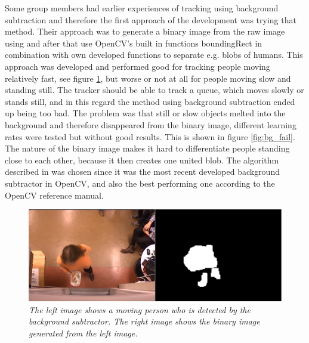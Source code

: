 
Some group members had earlier experiences of tracking using background subtraction and therefore the first approach of the development was trying that method. Their approach was to generate a binary image from the raw image using \cite{Gardel} and after that use OpenCV’s built in functions boundingRect in combination with own developed functions to separate e.g. blobs of humans. This approach was developed and performed good for tracking people moving relatively fast, see figure \ref{fig:bg_success}, but worse or not at all for people moving slow and standing still. The tracker should be able to track a queue, which moves slowly or stands still, and in this regard the method using background subtraction ended up being too bad. The problem was that still or slow objects melted into the background and therefore disappeared from the binary image, different learning rates were tested but without good results. This is shown in figure \ref{fig:bg_fail}. The nature of the binary image makes it hard to differentiate people standing close to each other, because it then creates one united blob. The algorithm described in \cite{Gardel} was chosen since it was the most recent developed background subtractor in OpenCV, and also the best performing one according to the OpenCV reference manual. 

\vspace{1cm}
\begin{figure}[htb]
	\centering
	\includegraphics[width=\linewidth]{images/bg_success.png}
	\caption[An example of a successful detection using background subtraction.]{\textit{The left image shows a moving person who is detected by the background subtractor. The right image shows the binary image generated from the left image.
	}}
	\label{fig:bg_success}  %
\end{figure}

